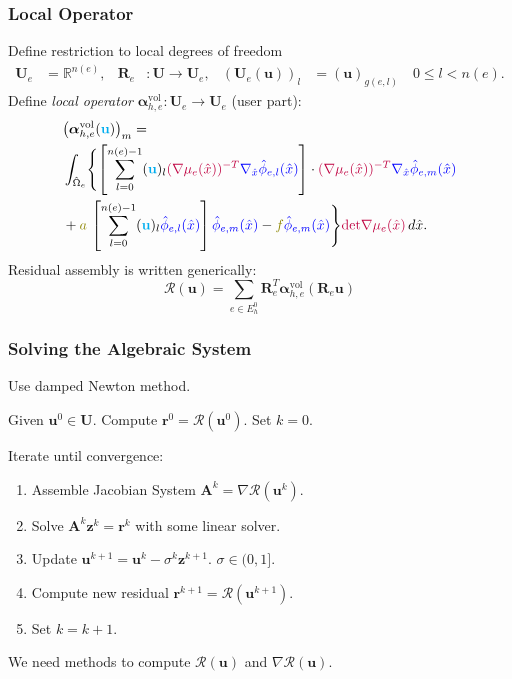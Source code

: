 \begin{frame}
\frametitle{Local Operator}
Define restriction to local degrees of freedom
\begin{align*}
\mathbf{U}_e &= \mathbb{R}^{n(e)}, &
\mathbf{R}_e &: \mathbf{U} \to \mathbf{U}_e, &
\left(\mathbf{U}_e(\mathbf{u})\right)_l &= (\mathbf{u})_{g(e,l)} \quad 0\leq l < n(e).
\end{align*}
Define \textit{local operator} $\bm{\alpha}^{\text{vol}}_{h,e} : \mathbf{U}_e \to \mathbf{U}_e$ (user part):
\begin{equation*}
\begin{split}
&\bigl(\bm{\alpha}^{\text{vol}}_{h,e}({\color{cyan}\mathbf{u}})\bigr)_m  = \\
&\int_{\hat\Omega_e} 
\Biggl\{\left[ \sum_{l=0}^{n(e)-1} ({\color{cyan}\mathbf{u}})_{l} {\color{purple}
(\nabla \mu_e(\hat{x}))^{-T}} {\color{blue}\nabla_{\hat{x}} \hat\phi_{e,l}(\hat{x})} \right]
\cdot {\color{purple}(\nabla \mu_e(\hat{x}))^{-T}} {\color{blue}\nabla_{\hat{x}} \hat\phi_{e,m}(\hat{x})}\\
& + {\color{olive} a} \, \left[ \sum_{l=0}^{n(e)-1} ({\color{cyan}\mathbf{u}})_{l}
 {\color{blue}\hat\phi_{e,l}(\hat{x})} \right] {\color{blue}\hat\phi_{e,m}(\hat{x})}
- {\color{olive} f} {\color{blue}\hat\phi_{e,m}(\hat{x})} \Biggr\} {\color{purple}\text{det} \nabla\mu_e(\hat{x})} \, d\hat{x} .
\end{split}
\end{equation*}
Residual assembly is written generically:
\begin{equation*}
\mathcal{R}(\mathbf{u}) = \sum_{e\in E_h^0} \mathbf{R}_e^T \bm{\alpha}^{\text{vol}}_{h,e} (\mathbf{R}_e \mathbf{u})
\end{equation*}
\end{frame}


\begin{frame}
\frametitle{Solving the Algebraic System}
Use damped Newton method.

Given $\mathbf{u}^0\in\mathbf{U}$. Compute $\mathbf{r}^0 = \mathcal{R}(\mathbf{u}^0)$. Set $k=0$.

Iterate until convergence:
\begin{enumerate}
\item Assemble Jacobian System $\mathbf{A}^k = \nabla\mathcal{R}(\mathbf{u}^k)$.
\item Solve $\mathbf{A}^k \mathbf{z}^k = \mathbf{r}^k$ with some linear solver.
\item Update $\mathbf{u}^{k+1} = \mathbf{u}^{k} - \sigma^k \mathbf{z}^{k+1}$. $\sigma\in(0,1]$.
\item Compute new residual $\mathbf{r}^{k+1} = \mathcal{R}(\mathbf{u}^{k+1})$.
\item Set $k = k +1$.
\end{enumerate}

We need methods to compute $\mathcal{R}(\mathbf{u})$ and $\nabla\mathcal{R}(\mathbf{u})$.
\end{frame}

